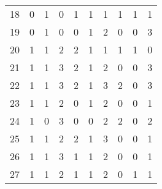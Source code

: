 \begin{longtable}{cp{1.5cm}p{1.5cm}p{1.5cm}p{1.5cm}p{1.5cm}p{1.5cm}p{1.5cm}p{1.5cm}p{1.5cm}}
18 &                      0 &                      1 &                      0 &                         1 &                         1 &                         1 &                      1 &                      1 &                      1 \\
19 &                      0 &                      1 &                      0 &                         0 &                         1 &                         2 &                      0 &                      0 &                      3 \\
20 &                      1 &                      1 &                      2 &                         2 &                         1 &                         1 &                      1 &                      1 &                      0 \\
21 &                      1 &                      1 &                      3 &                         2 &                         1 &                         2 &                      0 &                      0 &                      3 \\
22 &                      1 &                      1 &                      3 &                         2 &                         1 &                         3 &                      2 &                      0 &                      3 \\
23 &                      1 &                      1 &                      2 &                         0 &                         1 &                         2 &                      0 &                      0 &                      1 \\
24 &                      1 &                      0 &                      3 &                         0 &                         0 &                         2 &                      2 &                      0 &                      2 \\
25 &                      1 &                      1 &                      2 &                         2 &                         1 &                         3 &                      0 &                      0 &                      1 \\
26 &                      1 &                      1 &                      3 &                         1 &                         1 &                         2 &                      0 &                      0 &                      1 \\
27 &                      1 &                      1 &                      2 &                         1 &                         1 &                         2 &                      0 &                      1 &                      1 \\

\end{longtable}
